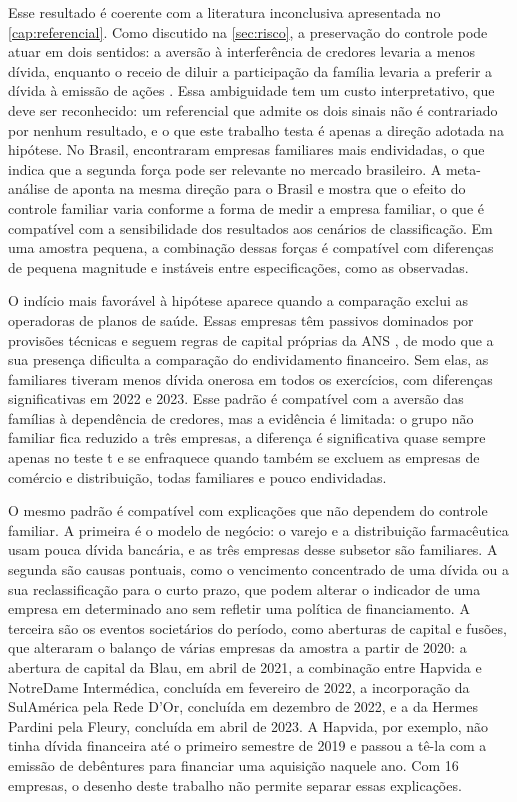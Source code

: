 Esse resultado é coerente com a literatura inconclusiva apresentada no
\autoref{cap:referencial}. Como discutido na \autoref{sec:risco}, a preservação do
controle pode atuar em dois sentidos: a aversão à interferência de credores levaria
a menos dívida, enquanto o receio de diluir a participação da família levaria a
preferir a dívida à emissão de ações \cite{gonzalez2013,poletti2022}. Essa
ambiguidade tem um custo interpretativo, que deve ser reconhecido: um referencial
que admite os dois sinais não é contrariado por nenhum resultado, e o que este
trabalho testa é apenas a direção adotada na hipótese. No Brasil,
 encontraram empresas familiares mais endividadas, o que
indica que a segunda força pode ser relevante no mercado brasileiro. A
meta-análise de  aponta na mesma direção para o Brasil e
mostra que o efeito do controle familiar varia conforme a forma de medir a empresa
familiar, o que é compatível com a sensibilidade dos resultados aos cenários de
classificação. Em uma amostra pequena, a combinação dessas forças é compatível com
diferenças de pequena magnitude e instáveis entre especificações, como as
observadas.

O indício mais favorável à hipótese aparece quando a comparação exclui as
operadoras de planos de saúde. Essas empresas têm passivos dominados por provisões
técnicas e seguem regras de capital próprias da ANS \cite{andrietta2022,brasil1998},
de modo que a sua presença dificulta a comparação do endividamento financeiro. Sem
elas, as familiares tiveram menos dívida onerosa em todos os exercícios, com
diferenças significativas em 2022 e 2023. Esse padrão é compatível com a aversão
das famílias à dependência de credores, mas a evidência é limitada: o grupo não
familiar fica reduzido a três empresas, a diferença é significativa quase sempre
apenas no teste t e se enfraquece quando também se excluem as empresas de comércio e
distribuição, todas familiares e pouco endividadas.

O mesmo padrão é compatível com explicações que não dependem do controle familiar.
A primeira é o modelo de negócio: o varejo e a distribuição farmacêutica usam
pouca dívida bancária, e as três empresas desse subsetor são familiares. A segunda
são causas pontuais, como o vencimento concentrado de uma dívida ou a sua
reclassificação para o curto prazo, que podem alterar o indicador de uma empresa em
determinado ano sem refletir uma política de financiamento. A terceira são os
eventos societários do período, como aberturas de capital e fusões, que alteraram o
balanço de várias empresas da amostra a partir de 2020: a abertura de capital da
Blau, em abril de 2021, a combinação entre Hapvida e NotreDame Intermédica,
concluída em fevereiro de 2022, a incorporação da SulAmérica pela Rede D'Or,
concluída em dezembro de 2022, e a da Hermes Pardini pela Fleury, concluída em
abril de 2023. A Hapvida, por exemplo, não tinha dívida financeira até o primeiro
semestre de 2019 e passou a tê-la com a emissão de debêntures para financiar uma
aquisição naquele ano. Com 16 empresas, o desenho deste trabalho não permite
separar essas explicações.

